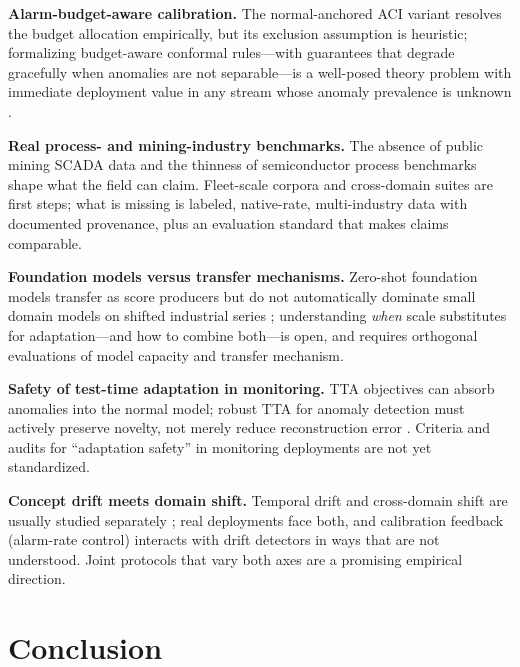 \textbf{Alarm-budget-aware calibration.} The normal-anchored ACI variant resolves the budget allocation empirically, but its exclusion assumption is heuristic; formalizing budget-aware conformal rules---with guarantees that degrade gracefully when anomalies are not separable---is a well-posed theory problem with immediate deployment value in any stream whose anomaly prevalence is unknown \cite{aci2021,2506_15831}.

\textbf{Real process- and mining-industry benchmarks.} The absence of public mining SCADA data and the thinness of semiconductor process benchmarks shape what the field can claim. Fleet-scale corpora \cite{2605_09081} and cross-domain suites \cite{2503_23060} are first steps; what is missing is labeled, native-rate, multi-industry data with documented provenance, plus an evaluation standard \cite{2511_18739} that makes claims comparable.

\textbf{Foundation models versus transfer mechanisms.} Zero-shot foundation models transfer as score producers but do not automatically dominate small domain models on shifted industrial series \cite{freqmatters2025,foundational2025,2505_11349}; understanding \emph{when} scale substitutes for adaptation---and how to combine both---is open, and requires orthogonal evaluations of model capacity and transfer mechanism.

\textbf{Safety of test-time adaptation in monitoring.} TTA objectives can absorb anomalies into the normal model; robust TTA for anomaly detection must actively preserve novelty, not merely reduce reconstruction error \cite{2312_11976,2604_01845}. Criteria and audits for ``adaptation safety'' in monitoring deployments are not yet standardized.

\textbf{Concept drift meets domain shift.} Temporal drift and cross-domain shift are usually studied separately \cite{2506_15831,2412_08435}; real deployments face both, and calibration feedback (alarm-rate control) interacts with drift detectors in ways that are not understood. Joint protocols that vary both axes are a promising empirical direction.

\section{Conclusion}
\label{sec:conclusion}


